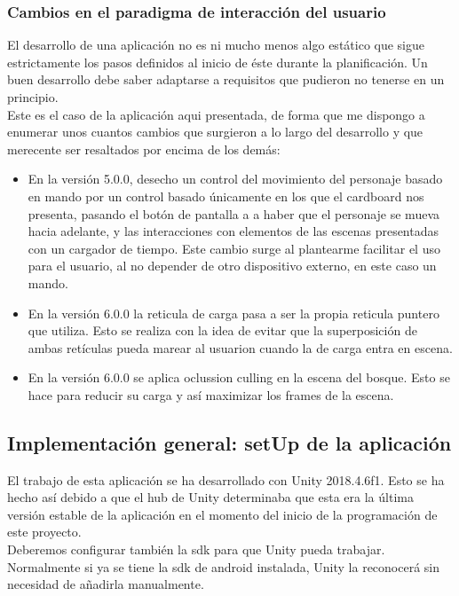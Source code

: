\subsubsection{Cambios en el paradigma de interacción del usuario}

\quad El desarrollo de una aplicación no es ni mucho menos algo estático que sigue estrictamente los pasos definidos al inicio de éste durante la planificación. Un buen desarrollo debe saber adaptarse a requisitos que pudieron no tenerse en un principio.\\

\quad Este es el caso de la aplicación aqui presentada, de forma que me dispongo a enumerar unos cuantos cambios que surgieron a lo largo del desarrollo y que merecente ser resaltados por encima de los demás:

\begin{itemize}
	\item En la versión 5.0.0, desecho un control del movimiento del personaje basado en mando por un control basado únicamente en los que el cardboard nos presenta, pasando el botón de pantalla a a haber que el personaje se mueva hacia adelante, y las interacciones con elementos de las escenas presentadas con un cargador de tiempo. Este cambio surge al plantearme facilitar el uso para el usuario, al no depender de otro dispositivo externo, en este caso un mando.
	\item En la versión 6.0.0 la reticula de carga pasa a ser la propia reticula puntero que utiliza. Esto se realiza con la idea de evitar que la superposición de ambas retículas pueda marear al usuarion cuando la de carga entra en escena.
	\item  En la versión 6.0.0 se aplica oclussion culling en la escena del bosque. Esto se hace para reducir su carga y así maximizar los frames de la escena.
\end{itemize}

\subsection{Implementación general: setUp de la aplicación}

\quad El trabajo de esta aplicación se ha desarrollado con Unity 2018.4.6f1. Esto se ha hecho así debido a que el hub de Unity determinaba que esta era la última versión estable de la aplicación en el momento del inicio de la programación de este proyecto.\\

\quad Deberemos configurar también la sdk para que Unity pueda trabajar. Normalmente si ya se tiene la sdk de android instalada, Unity la reconocerá sin necesidad de añadirla manualmente.\\

